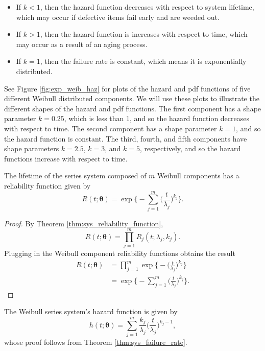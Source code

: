 \documentclass[
]{article}
\providecommand{\tightlist}{%
  \setlength{\itemsep}{0pt}\setlength{\parskip}{0pt}}
\begin{document}
\begin{itemize}
\tightlist
\item
  If \(k < 1\), then the hazard function decreases with respect to
  system lifetime, which may occur if defective items fail early and are
  weeded out.
\item
  If \(k > 1\), then the hazard function is increases with respect to
  time, which may occur as a result of an aging process.
\item
  If \(k = 1\), then the failure rate is constant, which means it is
  exponentially distributed.
\end{itemize}

See Figure \ref{fig:exp_weib_haz} for plots of the hazard and pdf
functions of five different Weibull distributed components. We will use
these plots to illustrate the different shapes of the hazard and pdf
functions. The first component has a shape parameter \(k=0.25\), which
is less than 1, and so the hazard function decreases with respect to
time. The second component has a shape parameter \(k=1\), and so the
hazard function is constant. The third, fourth, and fifth components
have shape parameters \(k=2.5\), \(k=3\), and \(k=5\), respectively, and
so the hazard functions increase with respect to time.

The lifetime of the series system composed of \(m\) Weibull components
has a reliability function given by \begin{equation}
\label{eq:sys_weibull_reliability_function}
R(t;\boldsymbol{\theta}) = \exp\biggl\{-\sum_{j=1}^{m}\biggl(\frac{t}{\lambda_j}\biggr)^{k_j}\biggr\}.
\end{equation}

\begin{proof}
By Theorem \ref{thm:sys_reliability_function},
$$
R(t;\boldsymbol{\theta}) = \prod_{j=1}^{m} R_j(t;\lambda_j,k_j).
$$
Plugging in the Weibull component reliability functions obtains the result
\begin{align*}
R(t;\boldsymbol{\theta})
    &= \prod_{j=1}^{m} \exp\biggl\{-\biggl(\frac{t}{\lambda_j}\biggr)^{k_j}\biggr\}\\
    &= \exp\biggl\{-\sum_{j=1}^{m}\biggl(\frac{t}{\lambda_j}\biggr)^{k_j}\biggr\}.
\end{align*}
\end{proof}

The Weibull series system's hazard function is given by \begin{equation}
\label{eq:sys_weibull_failure_rate_function}
h(t;\boldsymbol{\theta}) =
    \sum_{j=1}^{m} \frac{k_j}{\lambda_j}\biggl(\frac{t}{\lambda_j}\biggr)^{k_j-1},
\end{equation} whose proof follows from Theorem
\ref{thm:sys_failure_rate}.
\end{document}
